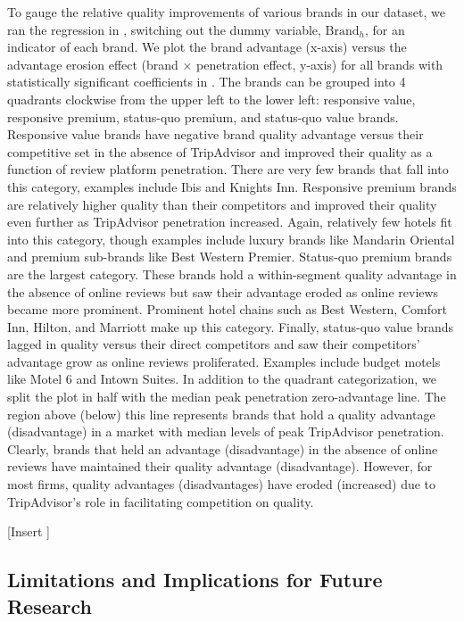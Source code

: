 \documentclass[mksc,blindrev]{informs3} %
\begin{document}
To gauge the relative quality improvements of various brands in our dataset, we ran the regression in , switching out the dummy variable, $\text{Brand}_h$, for an indicator of each brand. We plot the brand advantage (x-axis) versus the advantage erosion effect (brand $\times$ penetration effect, y-axis) for all brands with statistically significant coefficients in .  The brands can be grouped into 4 quadrants clockwise from the upper left to the lower left: responsive value, responsive premium, status-quo premium, and status-quo value brands. Responsive value brands have negative brand quality advantage versus their competitive set in the absence of TripAdvisor and improved their quality as a function of review platform penetration. There are very few brands that fall into this category, examples include Ibis and Knights Inn. Responsive premium brands are relatively higher quality than their competitors and improved their quality even further as TripAdvisor penetration increased. Again, relatively few hotels fit into this category, though examples include luxury brands like Mandarin Oriental and premium sub-brands like Best Western Premier. Status-quo premium brands are the largest category. These brands hold a within-segment quality advantage in the absence of online reviews but saw their advantage eroded as online reviews became more prominent. Prominent hotel chains such as Best Western, Comfort Inn, Hilton, and Marriott make up this category. Finally, status-quo value brands lagged in quality versus their direct competitors and saw their competitors' advantage grow as online reviews proliferated. Examples include budget motels like Motel 6 and Intown Suites. In addition to the quadrant categorization, we split the plot in half with the median peak penetration zero-advantage line. The region above (below) this line represents brands that hold a quality advantage (disadvantage) in a market with median levels of peak TripAdvisor penetration. Clearly, brands that held an advantage (disadvantage) in the absence of online reviews have maintained their quality advantage (disadvantage). However, for most firms, quality advantages (disadvantages) have eroded (increased) due to TripAdvisor's role in facilitating competition on quality. 

[Insert ]

\subsection{Limitations and Implications for Future Research}
\end{document}
